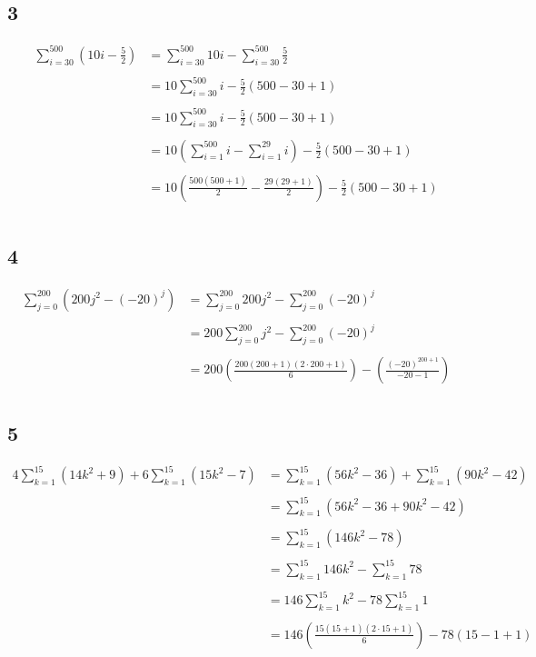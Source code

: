 \documentclass[12pt]{article}
\begin{document}
\subsection*{3}
\begin{align*}
  \sum_{i=30}^{500}\left(10i-\frac{5}{2}\right) &= \sum_{i=30}^{500}10i - \sum_{i=30}^{500}\frac{5}{2}\\ \\
  &= 10\sum_{i=30}^{500}i - \frac{5}{2}(500-30+1)\\ \\
  &= 10\sum_{i=30}^{500}i - \frac{5}{2}(500-30+1) \\ \\
  &= 10\left( \sum_{i=1}^{500}i - \sum_{i=1}^{29}i \right) - \frac{5}{2}(500-30+1) \\ \\
  &= 10\left( \frac{500(500+1)}{2} - \frac{29(29+1)}{2} \right) - \frac{5}{2}(500-30+1) \\ \\
\end{align*}

\subsection*{4}
\begin{align*}
  \sum_{j=0}^{200}(200j^2 - (-20)^j) &= \sum_{j=0}^{200}200j^2 - \sum_{j=0}^{200}(-20)^j\\ \\
  &= 200\sum_{j=0}^{200}j^2 - \sum_{j=0}^{200}(-20)^j\\ \\
  &= 200\left(\frac{200(200+1)(2\cdot200+1)}{6}\right) - \left(\frac{(-20)^{200+1}}{-20-1} \right)  \\
\end{align*}

\subsection*{5}
\begin{align*}
  4 \sum_{k=1}^{15}(14k^2 + 9) + 6 \sum_{k=1}^{15}(15k^2-7) &= \sum_{k=1}^{15}(56k^2 - 36) + \sum_{k=1}^{15}(90k^2-42) \\ \\
  &= \sum_{k=1}^{15}(56k^2 - 36 + 90k^2-42) \\ \\
  &= \sum_{k=1}^{15}(146k^2 - 78) \\ \\
  &= \sum_{k=1}^{15}146k^2 - \sum_{k=1}^{15}78 \\ \\
  &= 146\sum_{k=1}^{15}k^2 - 78\sum_{k=1}^{15}1 \\ \\
  &= 146\left(\frac{15(15+1)(2\cdot 15+1)}{6}\right) - 78(15-1+1)\\
\end{align*}
\end{document}
